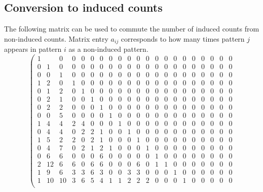 \documentclass{siamltex}
\begin{document}
\subsection{Conversion to induced counts}
The following matrix  can be used to commute the number of induced counts from  non-induced counts. 
 Matrix entry $a_{ij}$  corresponds to how many times pattern $j$ appears  in pattern $i$ as a non-induced pattern. 
{\tiny
\[ 
\left(
\begin{array}{ccccccccccccccccccccc}
1 &  &0 &0 &0 &0 &0 &0 &0 &0 &0 &0 &0 &0 &0 &0 &0 &0 &0 &0 &0  \\
0 &1 &0 &0 &0 &0 &0 &0 &0 &0 &0 &0 &0 &0 &0 &0 &0 &0 &0 &0 &0  \\
0 &0 &1 &0 &0 &0 &0 &0 &0 &0 &0 &0 &0 &0 &0 &0 &0 &0 &0 &0 &0  \\
1 &2 &0 &1 &0 &0 &0 &0 &0 &0 &0 &0 &0 &0 &0 &0 &0 &0 &0 &0 &0  \\
0 &1 &2 &0 &1 &0 &0 &0 &0 &0 &0 &0 &0 &0 &0 &0 &0 &0 &0 &0 &0  \\
0 &2 &1 &0 &0 &1 &0 &0 &0 &0 &0 &0 &0 &0 &0 &0 &0 &0 &0 &0 &0  \\
0 &2 &2 &0 &0 &0 &1 &0 &0 &0 &0 &0 &0 &0 &0 &0 &0 &0 &0 &0 &0  \\
0 &0 &5 &0 &0 &0 &0 &1 &0 &0 &0 &0 &0 &0 &0 &0 &0 &0 &0 &0 &0  \\
1 &4 &4 &2 &4 &0 &0 &0 &1 &0 &0 &0 &0 &0 &0 &0 &0 &0 &0 &0 &0  \\
0 &4 &4 &0 &2 &2 &1 &0 &0 &1 &0 &0 &0 &0 &0 &0 &0 &0 &0 &0 &0  \\
1 &5 &2 &2 &0 &2 &1 &0 &0 &0 &1 &0 &0 &0 &0 &0 &0 &0 &0 &0 &0  \\
0 &4 &7 &0 &2 &1 &2 &1 &0 &0 &0 &1 &0 &0 &0 &0 &0 &0 &0 &0 &0  \\
0 &6 &6 &0 &0 &0 &6 &0 &0 &0 &0 &0 &1 &0 &0 &0 &0 &0 &0 &0 &0  \\
2 &12 &6 &6 &0 &6 &6 &0 &0 &0 &6 &0 &1 &1 &0 &0 &0 &0 &0 &0 &0  \\
1 &9 &6 &3 &3 &6 &3 &0 &0 &3 &3 &0 &0 &0 &1 &0 &0 &0 &0 &0 &0  \\
1 &10 &10 &3 &6 &5 &4 &1 &1 &2 &2 &2 &0 &0 &0 &1 &0 &0 &0 &0 &0  \\

\end{array}\]}
\end{document}

